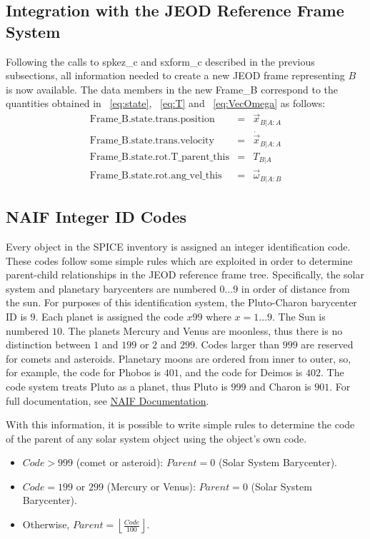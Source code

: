 \subsection {Integration with the JEOD Reference Frame System}
Following the calls to spkez\_c and sxform\_c described in the previous
subsections, all information needed to create a new JEOD frame representing
$B$ is now available.  The data members in the new Frame\_B correspond to the
quantities obtained in ~\ref{eq:state}, ~\ref{eq:T} and ~\ref{eq:VecOmega}
as follows:
\begin{eqnarray}
\mbox{Frame\_B.state.trans.position} & = & \vec{x}_{B|A:A} \\ \nonumber
\mbox{Frame\_B.state.trans.velocity} & = & \dot{\vec{x}}_{B|A:A} \\ \nonumber
\mbox{Frame\_B.state.rot.T\_parent\_this} & = & T_{B|A} \\ \nonumber
\mbox{Frame\_B.state.rot.ang\_vel\_this} & = & \vec{\omega}_{B|A:B}
\label{eq:FrameBDefinition}
\end{eqnarray}


\subsection {NAIF Integer ID Codes} \label{subsec:codes}
Every object in the SPICE inventory is assigned an integer identification code.
These codes follow some simple rules which are exploited in order to determine
parent-child relationships in the JEOD reference frame tree.  Specifically, the
solar system and planetary barycenters are numbered $0 \ldots 9$ in order of
distance from the sun. For purposes of this identification system,
the Pluto-Charon barycenter ID is $9$. Each planet is assigned the code $x99$
where $x = 1 \ldots 9$. The Sun is numbered $10$.  The planets Mercury and Venus
are moonless, thus there is no distinction between $1$ and $199$ or $2$ and $299$.
Codes larger than $999$ are reserved for comets and asteroids.  Planetary moons
are ordered from inner to outer, so, for example, the code for Phobos is $401$,
and the code for Deimos is $402$. The code system treats Pluto as a planet, thus
Pluto is $999$ and Charon is $901$. For full documentation,
see \href{https://naif.jpl.nasa.gov/naif/documentation.html}{NAIF Documentation}.

With this information, it is possible to write simple rules to determine the
code of the parent of any solar system object using the object's own code.
\begin{itemize}
\item $Code > 999$ (comet or asteroid): $Parent = 0$ (Solar System Barycenter).
\item $Code = 199$ or $299$ (Mercury or Venus): $Parent = 0$ (Solar System
Barycenter).
\item Otherwise, $Parent = \left\lfloor\frac{Code}{100}\right\rfloor$.
\end{itemize}
